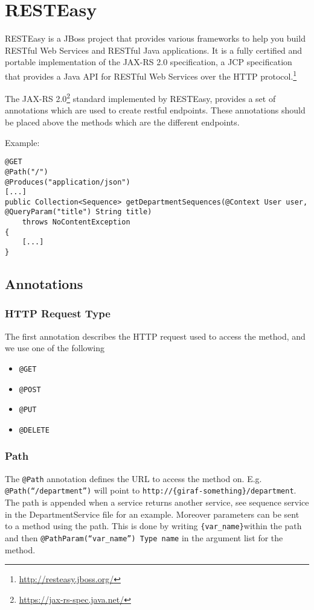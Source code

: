 \newpage
\section{RESTEasy}\label{app:resteasy}
\begin{displayquote}
RESTEasy is a JBoss project that provides various frameworks to help you build RESTful Web Services and RESTful Java applications.
It is a fully certified and portable implementation of the JAX-RS 2.0 specification, a JCP specification that provides a Java API for RESTful Web Services over the HTTP protocol.\footnote{\url{http://resteasy.jboss.org/}}
\end{displayquote}

\noindent
The JAX-RS 2.0\footnote{\url{https://jax-rs-spec.java.net/}} standard implemented by RESTEasy, provides a set of annotations which are used to create restful endpoints. These annotations should be placed above the methods which are the different endpoints.

\bigskip\noindent
Example:
\begin{lstlisting}
@GET
@Path("/")
@Produces("application/json")
[...]
public Collection<Sequence> getDepartmentSequences(@Context User user, @QueryParam("title") String title)
    throws NoContentException
{
    [...]
}
\end{lstlisting}

\subsection{Annotations}

\subsubsection{HTTP Request Type}
The first annotation describes the HTTP request used to access the method, and we use one of the following
\begin{itemize}
    \item \texttt{@GET}
    \item \texttt{@POST}
    \item \texttt{@PUT}
    \item \texttt{@DELETE}
\end{itemize}

\subsubsection{Path}
The \texttt{@Path} annotation defines the URL to access the method on. E.g. \texttt{@Path(``/department'')} will point to \texttt{http://\{giraf-something\}/department}.
The path is appended when a service returns another service, see sequence service in the DepartmentService file for an example.
Moreover parameters can be sent to a method using the path. This is done by writing \texttt{\{var\_name\}}within the path and then \texttt{@PathParam(``var\_name'') Type name} in the argument list for the method.

